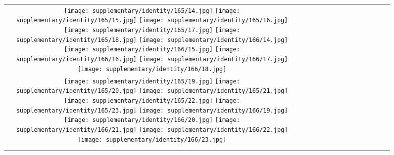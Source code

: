 \begin{figure*}[tb!]
{\begin{tabular}{c c c c c c c c c c c c c c }
\tabularnewline
  \texttt{[image: supplementary/identity/165/14.jpg]}
  \texttt{[image: supplementary/identity/165/15.jpg]}
  \texttt{[image: supplementary/identity/165/16.jpg]}
  \texttt{[image: supplementary/identity/165/17.jpg]}
  \texttt{[image: supplementary/identity/165/18.jpg]}
    \hspace{5mm}
  \texttt{[image: supplementary/identity/166/14.jpg]}
  \texttt{[image: supplementary/identity/166/15.jpg]}
  \texttt{[image: supplementary/identity/166/16.jpg]}
  \texttt{[image: supplementary/identity/166/17.jpg]}
  \texttt{[image: supplementary/identity/166/18.jpg]}

\tabularnewline
  \texttt{[image: supplementary/identity/165/19.jpg]}
  \texttt{[image: supplementary/identity/165/20.jpg]}
  \texttt{[image: supplementary/identity/165/21.jpg]}
  \texttt{[image: supplementary/identity/165/22.jpg]}
  \texttt{[image: supplementary/identity/165/23.jpg]}
    \hspace{5mm}
  \texttt{[image: supplementary/identity/166/19.jpg]}
  \texttt{[image: supplementary/identity/166/20.jpg]}
  \texttt{[image: supplementary/identity/166/21.jpg]}
  \texttt{[image: supplementary/identity/166/22.jpg]}
  \texttt{[image: supplementary/identity/166/23.jpg]}
    \tabularnewline

 \hspace{0.5mm}
  \tabularnewline
\vspace{2mm}
\vspace{-2\baselineskip}
\end{tabular}}
\vspace{-0.8cm}
\hspace{20pt}\label{fig:sup1b}
\vspace{-8mm}
\end{figure*}%